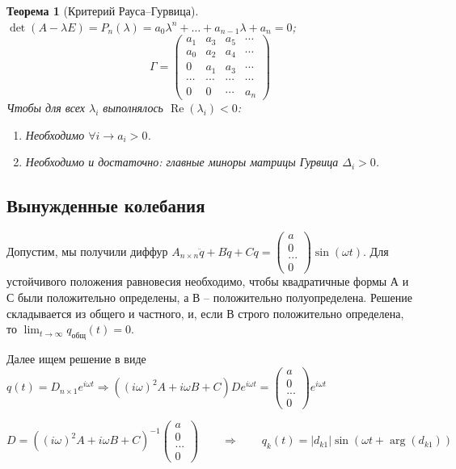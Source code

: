 \documentclass[12pt, a4paper]{article}
\theoremstyle{plain}
\newtheorem{theorem}{Теорема}[section] %
\theoremstyle{definition}
\theoremstyle{remark}
\begin{document}
\begin{theorem}[Критерий Рауса--Гурвица]
    $\det(A - \lambda E) = P_n(\lambda) = a_0 \lambda^n + \ldots + a_{n-1}\lambda + a_n = 0$;
\[
\Gamma = \begin{pmatrix}
a_1 & a_3 & a_5 & \cdots \\
a_0 & a_2 & a_4 & \cdots \\
0 & a_1 & a_3 & \cdots \\
\cdots&\cdots&\cdots&\cdots\\
0 &0 &\cdots & a_n
\end{pmatrix}
\]
Чтобы для всех $\lambda_i$ выполнялось $\operatorname{Re}(\lambda_i) < 0$:
\begin{enumerate}
    \item Необходимо $\forall i \to a_i > 0$.
    \item Необходимо и достаточно: главные миноры матрицы Гурвица $\Delta_i > 0$.
\end{enumerate}
\end{theorem}

\subsection{Вынужденные колебания}

Допустим, мы получили диффур $A_{n\times n} \ddot{q} + B \dot{q} + Cq= \begin{pmatrix} a \\ 0 \\ ... \\ 0 \end{pmatrix} \sin(\omega t)$. Для устойчивого положения равновесия необходимо, чтобы квадратичные формы А и С были положительно определены, а В -- положительно полуопределена. Решение складывается из общего и частного, и, если В строго положительно определена, то $\lim_{t \to \infty}q_{\text{общ}}(t) = 0$.

Далее ищем решение в виде $q(t) = D_{n\times 1} e^{i\omega t} \Rightarrow ((i\omega)^2A + i\omega B + C) D e^{i \omega t} = \begin{pmatrix} a \\ 0 \\ ... \\ 0 \end{pmatrix} e^{i \omega t}$

$D = ((i\omega)^2A + i\omega B + C)^{-1} \begin{pmatrix} a \\ 0 \\ ... \\ 0 \end{pmatrix} \qquad \Rightarrow \qquad q_k (t)= |d_{k1}| \sin(\omega t + \arg(d_{k1})) $
\end{document}
